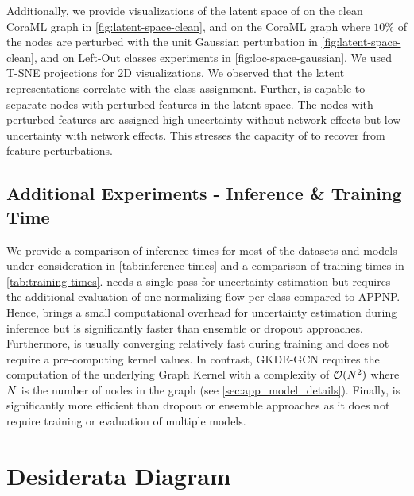 Additionally, we provide visualizations of the latent space of \GPNacro{} on the clean CoraML graph in \cref{fig:latent-space-clean}, and on the CoraML graph where $10\%$ of the nodes are perturbed with  the unit Gaussian perturbation in \cref{fig:latent-space-clean}, and on Left-Out classes experiments in \cref{fig:loc-space-gaussian}. We used T-SNE projections for 2D visualizations. We observed that the latent representations correlate with the class assignment. Further, \GPNacro{} is capable to separate nodes with perturbed features in the latent space. The nodes with perturbed features are assigned high uncertainty without network effects but low uncertainty with network effects. This stresses the capacity of \GPNacro{} to recover from feature perturbations. 
%

%

%


\subsection{Additional Experiments - Inference \& Training Time}
\label{sec:add-exp-time}

We provide a comparison of inference times for most of the datasets and models under consideration in \cref{tab:inference-times} and a comparison of training times in \cref{tab:training-times}. \GPNacro{} needs a single pass for uncertainty estimation but requires the additional evaluation of one normalizing flow per class compared to APPNP. Hence, \GPNacro{} brings a small computational overhead for uncertainty estimation during inference but is significantly faster than ensemble or dropout approaches. Furthermore, \GPNacro{} is usually converging relatively fast during training and does not require a pre-computing kernel values. In contrast, GKDE-GCN requires the computation of the underlying Graph Kernel with a complexity of $\mathcal{O}(N^2)$ where $N$ is the number of nodes in the graph (see \cref{sec:app_model_details}). Finally, \GPNacro{} is significantly more efficient than dropout or ensemble approaches as it does not require training or evaluation of multiple models.




\section{Desiderata Diagram}

